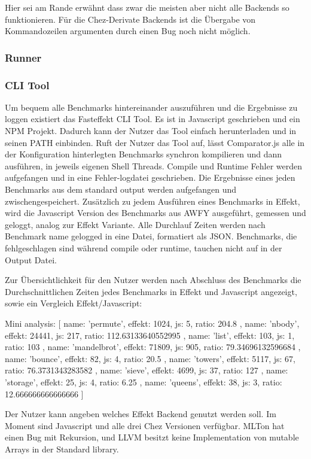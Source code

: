 Hier sei am Rande erwähnt dass zwar die meisten aber nicht alle Backends so funktionieren. Für die Chez-Derivate Backends ist die Übergabe von Kommandozeilen argumenten durch einen Bug noch nicht möglich.

\subsubsection{ Runner }
\subsubsection{ CLI Tool }
  
Um bequem alle Benchmarks hintereinander auszuführen und die Ergebnisse zu loggen existiert das Fasteffekt CLI Tool.
Es ist in Javascript geschrieben und ein NPM Projekt. Dadurch kann der Nutzer das Tool einfach herunterladen und in seinen PATH einbinden.
Ruft der Nutzer das Tool auf, lässt Comparator.js alle in der Konfiguration hinterlegten Benchmarks synchron kompilieren und dann ausführen, in jeweils eigenen Shell Threads. Compile und Runtime Fehler werden aufgefangen und in eine Fehler-logdatei geschrieben. Die Ergebnisse eines jeden Benchmarks aus dem standard output werden aufgefangen und zwischengespeichert.
Zusätzlich zu jedem Ausführen eines Benchmarks in Effekt, wird die Javascript Version des Benchmarks aus AWFY ausgeführt, gemessen und geloggt, analog zur Effekt Variante.
Alle Durchlauf Zeiten werden nach Benchmark name gelogged in eine Datei, formatiert als JSON.
Benchmarks, die fehlgeschlagen sind während compile oder runtime, tauchen nicht auf in der Output Datei.

Zur Übersichtlichkeit für den Nutzer werden nach Abschluss des Benchmarks die Durchschnittlichen Zeiten jedes Benchmarks in Effekt und Javascript angezeigt, sowie ein Vergleich Effekt/Javascript:

Mini analysis: [
{ name: 'permute', effekt: 1024, js: 5, ratio: 204.8 },
{ name: 'nbody', effekt: 24441, js: 217, ratio: 112.63133640552995 },
{ name: 'list', effekt: 103, js: 1, ratio: 103 },
{
name: 'mandelbrot',
effekt: 71809,
js: 905,
ratio: 79.34696132596684
},
{ name: 'bounce', effekt: 82, js: 4, ratio: 20.5 },
{ name: 'towers', effekt: 5117, js: 67, ratio: 76.3731343283582 },
{ name: 'sieve', effekt: 4699, js: 37, ratio: 127 },
{ name: 'storage', effekt: 25, js: 4, ratio: 6.25 },
{ name: 'queens', effekt: 38, js: 3, ratio: 12.666666666666666 }
] 

Der Nutzer kann angeben welches Effekt Backend genutzt werden soll. Im Moment sind Javascript und alle drei Chez Versionen verfügbar.
MLTon hat einen Bug mit Rekursion, und LLVM besitzt keine Implementation von mutable Arrays in der Standard library.

